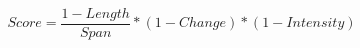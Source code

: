 
\begin{equation} \label{eq:score}
Score = \frac{1-Length}{Span} * (1 - Change)*(1-Intensity)
\end{equation}



